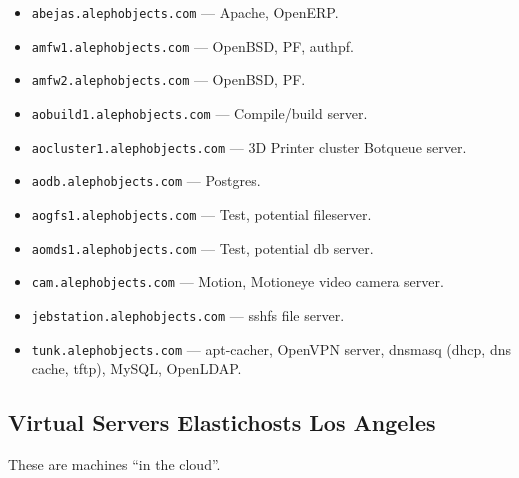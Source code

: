 \begin{itemize}
\item \texttt{abejas.alephobjects.com} --- Apache, OpenERP.
\item \texttt{amfw1.alephobjects.com} --- OpenBSD, PF, authpf.
\item \texttt{amfw2.alephobjects.com} --- OpenBSD, PF.
\item \texttt{aobuild1.alephobjects.com} --- Compile/build server.
\item \texttt{aocluster1.alephobjects.com} --- 3D Printer cluster Botqueue
       server.
\item \texttt{aodb.alephobjects.com} --- Postgres.
\item \texttt{aogfs1.alephobjects.com} --- Test, potential fileserver.
\item \texttt{aomds1.alephobjects.com} --- Test, potential db server.
\item \texttt{cam.alephobjects.com} --- Motion, Motioneye video camera server.
\item \texttt{jebstation.alephobjects.com} --- sshfs file server.
\item \texttt{tunk.alephobjects.com} --- apt-cacher, OpenVPN server, dnsmasq
      (dhcp, dns cache, tftp), MySQL, OpenLDAP.
\end{itemize}

\subsection{Virtual Servers Elastichosts Los Angeles}
These are machines ``in the cloud''.

